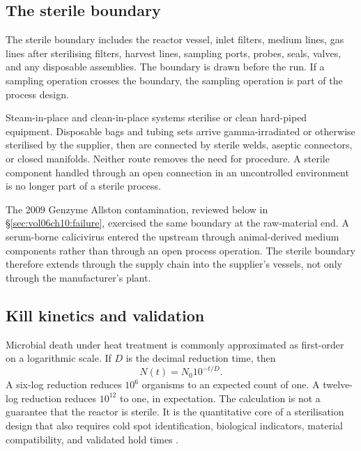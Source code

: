 \subsection{The sterile boundary}

The sterile boundary includes the reactor vessel, inlet filters,
medium lines, gas lines after sterilising filters, harvest lines,
sampling ports, probes, seals, valves, and any disposable assemblies.
The boundary is drawn before the run. If a sampling operation crosses
the boundary, the sampling operation is part of the process design.

Steam-in-place and clean-in-place systems sterilise or clean hard-piped
equipment. Disposable bags and tubing sets arrive gamma-irradiated or
otherwise sterilised by the supplier, then are connected by sterile
welds, aseptic connectors, or closed manifolds. Neither route removes
the need for procedure. A sterile component handled through an open
connection in an uncontrolled environment is no longer part of a sterile
process.

The 2009 Genzyme Allston contamination, reviewed below in
\S\ref{sec:vol06ch10:failure}, exercised the same boundary at the
raw-material end. A serum-borne calicivirus
\cite{paper:v6c10-vesivirus-2117-victoria-2006} entered the upstream
through animal-derived medium components rather than through an open
process operation. The sterile boundary therefore extends through the
supply chain into the supplier's vessels, not only through the
manufacturer's plant.

\subsection{Kill kinetics and validation}

Microbial death under heat treatment is commonly approximated as
first-order on a logarithmic scale. If $D$ is the decimal reduction
time, then
\[
N(t) = N_0 10^{-t/D}.
\]
A six-log reduction reduces $10^6$ organisms to an expected count of
one. A twelve-log reduction reduces $10^{12}$ to one, in expectation.
The calculation is not a guarantee that the reactor is sterile. It is
the quantitative core of a sterilisation design that also requires cold
spot identification, biological indicators, material compatibility, and
validated hold times \cite[ch.~7]{text:stanbury-fermentation}.



